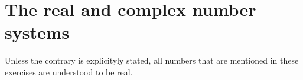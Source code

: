 \chapter{The real and complex number systems}
\label{chapter:the-real-and-complex-number-systems}

Unless the contrary is explicityly stated, all numbers that are mentioned in
these exercises are understood to be real.


